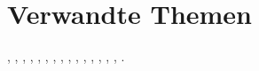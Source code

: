 \chapter{Verwandte Themen}\label{ch:related}
\cite{Agarwal2006}, \cite{Byers2002}, \cite{Duerr2010}, \cite{Hellerstein1994}, \cite{Lehman1986}, \cite{Nafe2005}, \cite{Qiao2014}, \cite{Ruppel2014}, \cite{Sarwat2012}, \cite{Schnell2013}, \cite{Schoenfeld2014}, \cite{Shiraki2009}, \cite{Yang2002}, \cite{Zhang2012}, \cite{Zhu2004}, \cite{Jannink1995}.

